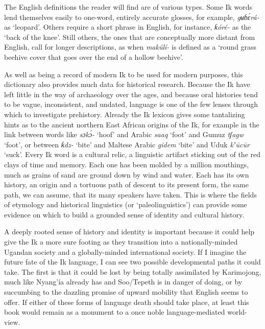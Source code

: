 The English definitions the reader will find are of various types. Some Ik words lend themselves easily to one-word, entirely accurate glosses, for example, \textit{gʉɓ\'{ɛ}rá- }as ‘leopard’. Others require a short phrase in English, for instance, \textit{ƙóré- }as the ‘back of the knee’. Still others, the ones that are conceptually more distant from English, call for longer descriptions, as when \textit{makúlí- }is defined as a ‘round grass beehive cover that goes over the end of a hollow beehive’.

As well as being a record of modern Ik to be used for modern purposes, this dictionary also provides much data for historical research. Because the Ik have left little in the way of archaeology over the ages, and because oral histories tend to be vague, inconsistent, and undated, language is one of the few lenses through which to investigate prehistory. Already the Ik lexicon gives some tantalizing hints as to the ancient northern East African origins of the Ik, for example in the link between words like \textit{sɔk\'{ɔ}- }‘hoof’ and Arabic \textit{saaq }‘foot’ and Gumuz \textit{tʃagw }‘foot’, or between \textit{ƙ{\Í}dz- }‘bite’ and Maltese Arabic \textit{gidem }‘bite’ and Uduk \textit{kʼ\={u}c\={u}r }‘suck’. Every Ik word is a cultural relic, a linguistic artifact sticking out of the red clays of time and memory. Each one has been molded by a million mouthings, much as grains of sand are ground down by wind and water. Each has its own history, an origin and a tortuous path of descent to its present form, the same path, we can assume, that its many speakers have taken. This is where the fields of etymology and historical linguistics (or ‘paleolinguistics’) can provide some evidence on which to build a grounded sense of identity and cultural history.

A deeply rooted sense of history and identity is important because it could help give the Ik a more sure footing as they transition into a nationally-minded Ugandan society and a globally-minded international society. If I imagine the future fate of the Ik language, I can see two possible developmental paths it could take. The first is that it could be lost by being totally assimilated by Karimojong, much like Nyang’ía already has and Soo/Tepeth is in danger of doing, or by succumbing to the dazzling promise of upward mobility that English seems to offer. If either of these forms of language death should take place, at least this book would remain as a monument to a once noble language-mediated world-view.

